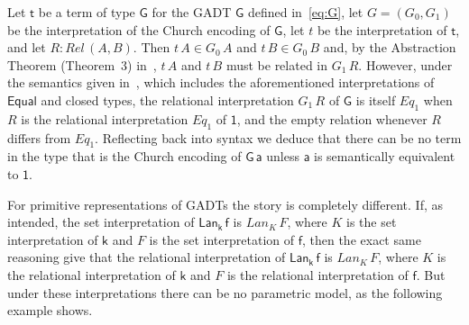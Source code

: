 \documentclass[acmsmall,screen,review,anonymous]{acmart}
\theoremstyle{definition}
\begin{document}
\begin{example}\label{ex:CE-par}
Let $\mathsf{t}$ be a term of type $\mathsf{G}$ for the GADT
$\mathsf{G}$ defined in~\eqref{eq:G}, let $G = (G_0,G_1)$ be the
interpretation of the Church encoding of $\mathsf{G}$, let $t$ be the
interpretation of $\mathsf{t}$, and let $R :
\mathit{Rel}\,(A,B)$. Then $t\, A \in G_0\,A$ and $t\,B \in G_0\,B$
and, by the Abstraction Theorem (Theorem~3) in~\cite{atk12}, $t\,A$
and $t\,B$ must be related in $G_1\,R$. However, under the semantics
given in~\cite{atk12}, which includes the aforementioned
interpretations of $\mathsf{Equal}$ and closed types, the relational
interpretation $G_1\,R$ of $\mathsf{G}$ is itself $\mathit{Eq}_1$ when
$R$ is the relational interpretation $\mathit{Eq}_1$ of $\mathsf{1}$,
and the empty relation whenever $R$ differs from
$\mathit{Eq}_1$. Reflecting back into syntax we deduce that there can
be no term in the type that is the Church encoding of $\mathsf{G\,a}$
unless $\mathsf{a}$ is semantically equivalent to $\mathsf{1}$.
\end{example}

For primitive representations of GADTs the story is completely
different. If, as intended, the set interpretation of
$\mathsf{Lan_k\,f}$ is $\mathit{Lan}_K\,F$, where $K$ is the set
interpretation of $\mathsf{k}$ and $F$ is the set interpretation of
$\mathsf{f}$, then the exact same reasoning give that the relational
interpretation of $\mathsf{Lan_k\,f}$ is $\mathit{Lan}_K\,F$, where
$K$ is the relational interpretation of $\mathsf{k}$ and $F$ is the
relational interpretation of $\mathsf{f}$. But under these
interpretations there can be no parametric model, as the following
example shows.
\end{document}
